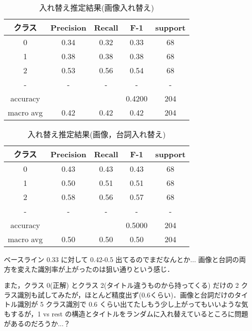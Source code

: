 \documentclass[onecolumn]{ujarticle}   %
\begin{document}
	\begin{table}[h]
		\vspace{-3mm}
		\centering
		\caption{入れ替え推定結果(画像入れ替え)}
		\label{tab:result_imagechange}
		\begin{tabular}{|c|c|c|c|c|} \hline
			クラス&Precision&Recall&F-1&support\\ \hline\hline
			0&0.34&0.32&0.33&68\\ \hline
			1&0.38&0.38&0.38&68\\ \hline
			2&0.53&0.56&0.54&68\\ \hline
			-&-&-&-&-\\ \hline
			accuracy&&&0.4200&204\\ \hline
			macro avg&0.42&0.42&0.42&204\\ \hline
		\end{tabular}
	\end{table}

	\begin{table}[h]
		\vspace{-3mm}
		\centering
		\caption{入れ替え推定結果(画像，台詞入れ替え)}
		\label{tab:result_bothchange}
		\begin{tabular}{|c|c|c|c|c|} \hline
			クラス&Precision&Recall&F-1&support\\ \hline\hline
			0&0.43&0.43&0.43&68\\ \hline
			1&0.50&0.51&0.51&68\\ \hline
			2&0.58&0.56&0.57&68\\ \hline
			-&-&-&-&-\\ \hline
			accuracy&&&0.5000&204\\ \hline
			macro avg&0.50&0.50&0.50&204\\ \hline
		\end{tabular}
	\end{table}

	ベースライン 0.33 に対して 0.42-0.5 出てるのでまだなんとか...
	画像と台詞の両方を変えた識別率が上がったのは狙い通りという感じ．

	また，クラス 0(正解) とクラス 2(タイトル違うものから持ってくる) だけの 2 クラス識別も試してみたが，ほとんど精度出ず(0.6くらい)．画像と台詞だけのタイトル識別が 5 クラス識別で 0.6 くらい出てたしもう少し上がってもいいような気もするが，1 vs rest の構造とタイトルをランダムに入れ替えているところに問題があるのだろうか...？
\end{document}
